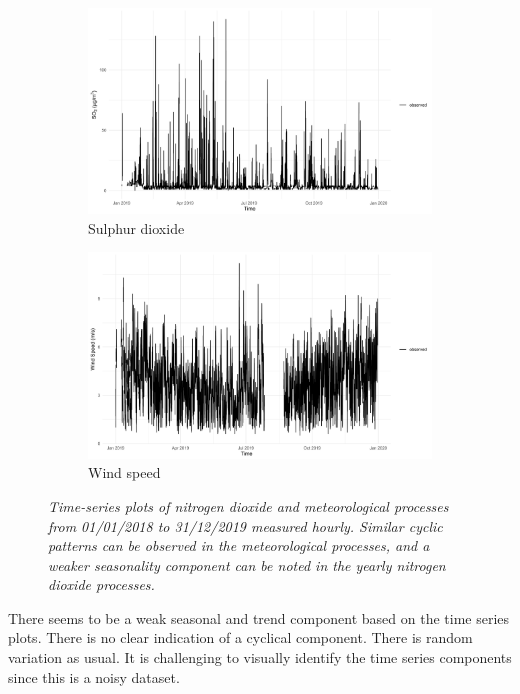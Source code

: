 \begin{figure}[H]
            \begin{subfigure}{0.48\linewidth}
               \centering
               \includegraphics[width=\linewidth]{../images/extracted_data_so2.png}
            \caption{Sulphur dioxide}
            \end{subfigure}
            \hfill
            \begin{subfigure}{0.48\linewidth}
               \centering
               \includegraphics[width=\linewidth]{../images/extracted_data_speed.png}
               \caption{Wind speed}
            \end{subfigure}

            \caption{\textit{Time-series plots of nitrogen dioxide and meteorological processes from 01/01/2018 to 31/12/2019 measured hourly. Similar cyclic patterns can be observed in the meteorological processes, and a weaker seasonality component can be noted in the yearly nitrogen dioxide processes.}}
         \end{figure}

         There seems to be a weak seasonal and trend component based on the time series plots. There is no clear indication of a cyclical component. There is random variation as usual. It is challenging to visually identify the time series components since this is a noisy dataset.
      
